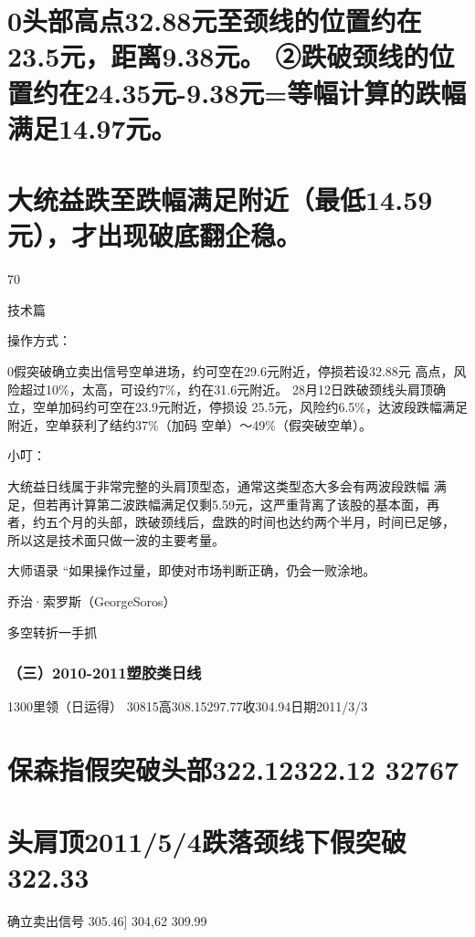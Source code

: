 \documentclass{article}
\begin{document}
\section{0头部高点32.88元至颈线的位置约在23.5元，距离9.38元。 ②跌破颈线的位置约在24.35元-9.38元=等幅计算的跌幅满足14.97元。}

\section{大统益跌至跌幅满足附近（最低14.59元），才出现破底翻企稳。}

70

\clearpage

技术篇

操作方式：

0假突破确立卖出信号空单进场，约可空在29.6元附近，停损若设32.88元 高点，风险超过10\%，太高，可设约7\%，约在31.6元附近。 28月12日跌破颈线头肩顶确立，空单加码约可空在23.9元附近，停损设 25.5元，风险约6.5\%，达波段跌幅满足附近，空单获利了结约37\%（加码 空单）～49\%（假突破空单）。

小叮：

大统益日线属于非常完整的头肩顶型态，通常这类型态大多会有两波段跌幅 满足，但若再计算第二波跌幅满足仅剩5.59元，这严重背离了该股的基本面，再 者，约五个月的头部，跌破颈线后，盘跌的时间也达约两个半月，时间已足够， 所以这是技术面只做一波的主要考量。

大师语录 “如果操作过量，即使对市场判断正确，仍会一败涂地。

乔治·索罗斯（GeorgeSoros）

\clearpage

多空转折一手抓

\subsubsection{（三）2010-2011塑胶类日线}

1300里领（日运得） 30815高308.15297.77收304.94日期2011/3/3

\section{保森指假突破头部322.12322.12 32767}

\section{头肩顶2011/5/4跌落颈线下假突破322.33}

确立卖出信号 305.46] 304,62 309.99
\end{document}
